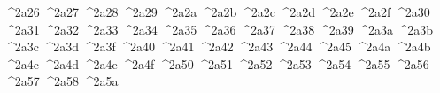 {  ^^^^2a26%
  ^^^^2a27%
  ^^^^2a28%
  ^^^^2a29%
  ^^^^2a2a%
  ^^^^2a2b%
  ^^^^2a2c%
  ^^^^2a2d%
  ^^^^2a2e%
  ^^^^2a2f%
  ^^^^2a30%
  ^^^^2a31%
  ^^^^2a32%
  ^^^^2a33%
  ^^^^2a34%
  ^^^^2a35%
  ^^^^2a36%
  ^^^^2a37%
  ^^^^2a38%
  ^^^^2a39%
  ^^^^2a3a%
  ^^^^2a3b%
  ^^^^2a3c%
  ^^^^2a3d%
  ^^^^2a3f%
  ^^^^2a40%
  ^^^^2a41%
  ^^^^2a42%
  ^^^^2a43%
  ^^^^2a44%
  ^^^^2a45%
  ^^^^2a4a%
  ^^^^2a4b%
  ^^^^2a4c%
  ^^^^2a4d%
  ^^^^2a4e%
  ^^^^2a4f%
  ^^^^2a50%
  ^^^^2a51%
  ^^^^2a52%
  ^^^^2a53%
  ^^^^2a54%
  ^^^^2a55%
  ^^^^2a56%
  ^^^^2a57%
  ^^^^2a58%
  ^^^^2a5a%
}
